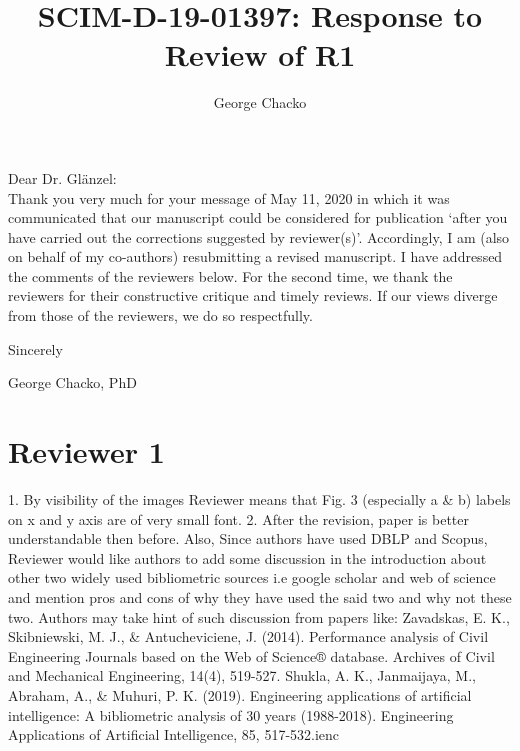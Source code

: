 \documentclass[11pt, oneside]{article}   	%
\title{SCIM-D-19-01397: Response to Review of R1}
\author{George Chacko}
\begin{document}
\maketitle

\vspace{30 mm}
\noindent Dear Dr. Gl{\"a}nzel:\\

Thank you very much for your message of May 11, 2020 in which it was communicated that our manuscript could be considered for publication `after you have carried out the corrections 
suggested by reviewer(s)'. Accordingly, I am (also on behalf of my co-authors) resubmitting a revised manuscript. I have addressed the comments  of the reviewers below. For the second time, 
we thank the reviewers for their constructive critique and timely reviews. If our views diverge from those of the reviewers, we do so respectfully.

\vspace{8 mm}

\noindent Sincerely

\vspace{8 mm}

\noindent George Chacko, PhD

\newpage

\section*{Reviewer 1} 1. By visibility of the images Reviewer means that Fig. 3 (especially a \& b) labels on x and y axis are of very small font. 2. After the revision, paper is better understandable then before. Also, Since authors have 
used DBLP and Scopus, Reviewer would like authors to add  some discussion in the introduction about other two widely used bibliometric sources i.e google scholar and web of science and mention pros and cons of why they have used 
the said two and why not these two. Authors may take hint of such discussion from papers like: Zavadskas, E. K., Skibniewski, M. J., \& Antucheviciene, J. (2014). Performance analysis of Civil Engineering Journals based on the Web of Science® 
database. Archives of Civil and Mechanical Engineering, 14(4), 519-527. Shukla, A. K., Janmaijaya, M., Abraham, A., \& Muhuri, P. K. (2019). Engineering applications of artificial intelligence: A bibliometric analysis of 30 years (1988-2018). 
Engineering Applications of Artificial Intelligence, 85, 517-532.ienc
\end{document}

